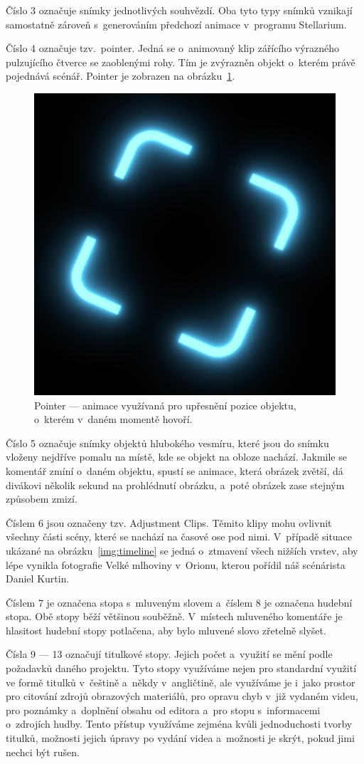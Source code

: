 \documentclass[12pt,a4paper,titlepage]{article}
\begin{document}
Číslo 3 označuje snímky jednotlivých souhvězdí. Oba tyto typy snímků vznikají samostatně zároveň s~generováním předchozí animace v~programu Stellarium.

Číslo 4 označuje tzv.\ pointer. Jedná se o~animovaný klip zářícího výrazného pulzujícího čtverce se zaoblenými rohy. Tím je zvýrazněn objekt o~kterém právě pojednává scénář. Pointer je zobrazen na obrázku~\ref{img:pointer}. 

\begin{figure}[H]
	\centering
	\includegraphics[width=.5\textwidth]{pointer.eps}
	\caption{Pointer --- animace využívaná pro upřesnění pozice objektu, o~kterém v~daném momentě hovoří.}\label{img:pointer}
\end{figure}

Číslo 5 označuje snímky objektů hlubokého vesmíru, které jsou do snímku vloženy nejdříve pomalu na místě, kde se objekt na obloze nachází. Jakmile se komentář zmíní o~daném objektu, spustí se animace, která obrázek zvětší, dá divákovi několik sekund na prohlédnutí obrázku, a~poté obrázek zase stejným způsobem zmizí.

Číslem 6 jsou označeny tzv. Adjustment Clips. Těmito klipy mohu ovlivnit všechny části scény, které se nachází na časové ose pod nimi. V~případě situace ukázané na obrázku~\ref{img:timeline} se jedná o~ztmavení všech nižších vrstev, aby lépe vynikla fotografie Velké mlhoviny v~Orionu, kterou pořídil náš scénárista Daniel Kurtin.

Číslem 7 je označena stopa s~mluveným slovem a~číslem 8 je označena hudební stopa. Obě stopy běží většinou souběžně. V~místech mluveného komentáře je hlasitost hudební stopy potlačena, aby bylo mluvené slovo zřetelně slyšet.

Čísla 9 --- 13 označují titulkové stopy. Jejich počet a~využití se mění podle požadavků daného projektu. Tyto stopy využíváme nejen pro standardní využití ve formě titulků v~češtině a~někdy v~angličtině, ale využíváme je i~jako prostor pro citování zdrojů obrazových materiálů, pro opravu chyb v~již vydaném videu, pro poznámky a~doplnění obsahu od editora a~pro stopu s~informacemi o~zdrojích hudby. Tento přístup využíváme zejména kvůli jednoduchosti tvorby titulků, možnosti jejich úpravy po vydání videa a~možnosti je skrýt, pokud jimi nechci být rušen. 
\end{document}
